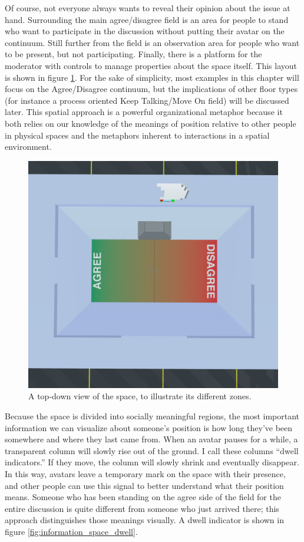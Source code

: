 Of course, not everyone always wants to reveal their opinion about the issue at hand. Surrounding the main agree/disagree field is an area for people to stand who want to participate in the discussion without putting their avatar on the continuum. Still further from the field is an observation area for people who want to be present, but not participating. Finally, there is a platform for the moderator with controls to manage properties about the space itself. This layout is shown in figure \ref{fig:information_space_layout}. For the sake of simplicity, most examples in this chapter will focus on the Agree/Disagree continuum, but the implications of other floor types (for instance a process oriented Keep Talking/Move On field) will be discussed later. This spatial approach is a powerful organizational metaphor because it both relies on our knowledge of the meanings of position relative to other people in physical spaces \citep{Yee:2007cl} and the metaphors inherent to interactions in a spatial environment. \citep{lakoff_metaphors_1980}

\begin{figure}[t]
	\includegraphics{figures/layout.png}
	\caption{A top-down view of the space, to illustrate its different zones.}
	\label{fig:information_space_layout}
\end{figure}

Because the space is divided into socially meaningful regions, the most important information we can visualize about someone's position is how long they've been somewhere and where they last came from. When an avatar pauses for a while, a transparent column will slowly rise out of the ground. I call these columns ``dwell indicators.'' If they move, the column will slowly shrink and eventually disappear. In this way, avatars leave a temporary mark on the space with their presence, and other people can use this signal to better understand what their position means. Someone who has been standing on the agree side of the field for the entire discussion is quite different from someone who just arrived there; this approach distinguishes those meanings visually. A dwell indicator is shown in figure \ref{fig:information_space_dwell}.

